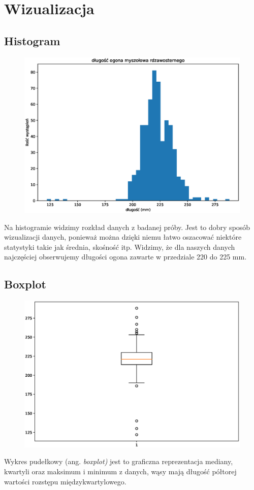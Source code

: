 \documentclass{article}
\theoremstyle{break}
\begin{document}
	\section{Wizualizacja}
	\subsection{Histogram}
	\begin{figure}[H]
	\begin{center}
		\includegraphics[scale=0.75]{HISTOGRAM.eps}
	\end{center}
	\end{figure}
Na histogramie widzimy rozkład danych z badanej próby. Jest to dobry sposób wizualizacji danych, ponieważ można dzięki niemu łatwo oszacować niektóre statystyki takie jak średnia, skośność itp. Widzimy, że dla naszych danych najczęściej obserwujemy długości ogona zawarte w przedziale 220 do 225 mm.
	\subsection{Boxplot}
	\begin{figure}[H]
	\begin{center}
		\includegraphics[scale=0.75]{BOXPLOT.eps}
	\end{center}
	\end{figure}
Wykres pudełkowy (ang. \textit{boxplot)} jest to graficzna reprezentacja mediany, kwartyli oraz maksimum i minimum z danych, wąsy mają długość półtorej wartości rozstępu międzykwartylowego.
\end{document}
